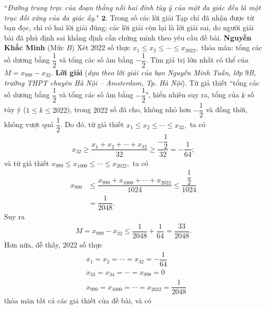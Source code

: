 \begin{multicols}{2}
	\vskip 0.05cm
	``\textit{Đường trung trực của đoạn thẳng nối hai đỉnh tùy ý của một đa giác đều là một trục đối xứng của đa giác ấy.}"
	\vskip 0.05cm
	$\pmb{2.}$ Trong số các lời giải Tạp chí đã nhận được từ bạn đọc, chỉ có hai lời giải đúng; các lời giải còn lại là lời giải sai, do người giải bài đã phủ định sai khẳng định cần chứng minh theo yêu cầu đề bài.
	\vskip 0.05cm
	\hfill\textbf{\color{thachthuctoanhoc}Nguyễn Khắc Minh}
	\vskip 0.1cm
	{}
	(Mức $B$)
	Xét $2022$ số thực ${x_1} \le {x_2} \le  \cdots  \le {x_{2022}},$  thỏa mãn: tổng các số dương bằng $\dfrac{1}{2}$  và tổng các số âm bằng $-\dfrac{1}{2}$. Tìm giá trị lớn nhất có thể của $M = {x_{999}} - {x_{32}}.$
	\vskip 0.05cm 
	\textbf{\color{thachthuctoanhoc}Lời giải} (\textit{dựa theo lời giải của bạn Nguyễn Minh Tuấn, lớp $9$B, trường THPT chuyên Hà Nội -- Amsterdam, Tp. Hà Nội}).
	\vskip 0.05cm
	Từ giả thiết ``tổng các số dương bằng $\dfrac{1}{2}$ và tổng các số âm bằng $-\dfrac{1}{2}$", hiển nhiên suy ra, tổng của $k$ số tùy ý ($1 \le k \le 2022$), trong $2022$ số đã cho, không nhỏ hơn $-\dfrac{1}{2}$ và đồng thời, không vượt quá $\dfrac{1}{2}$.
	\vskip 0.05cm
	Do đó, từ giả thiết ${x_1} \le {x_2} \le  \cdots  \le {x_{32}},$ ta có
	\begin{align*}
		{x_{32}} \ge \dfrac{{{x_1} + {x_2} +  \cdots  + {x_{32}}}}{{32}} \ge \dfrac{{ - \dfrac{1}{2}}}{{32}} =  - \dfrac{1}{{64}};
	\end{align*}
	và từ giả thiết  ${x_{999}} \le {x_{1000}} \le  \cdots  \le {x_{2022}},$ ta có
	\begin{align*}
		{x_{999}} &\le \dfrac{{{x_{999}} + {x_{1000}} +  \cdots  + {x_{2022}}}}{{1024}} \le \dfrac{{\dfrac{1}{2}}}{{1024}}\\
		 &= \dfrac{1}{{2048}}.
	\end{align*}
	Suy ra
	\begin{align*}
		M = {x_{999}} - {x_{32}} \le \dfrac{1}{{2048}} + \dfrac{1}{{64}} = \dfrac{{33}}{{2048}}.
	\end{align*}
	Hơn nữa, dễ thấy, $2022$ số thực
	\begin{align*}
		&{x_1} = {x_2} =  \cdots  = {x_{32}} =  - \dfrac{1}{{64}}\\
		&{x_{33}} = {x_{34}} =  \cdots  = {x_{998}} = 0\\
		&{x_{999}} = {x_{1000}} =  \cdots  = {x_{2022}} = \dfrac{1}{{2048}}
	\end{align*}
	thỏa mãn tất cả các giả thiết của đề bài, và có
	\begin{align*}

\end{align*}
\end{multicols}

